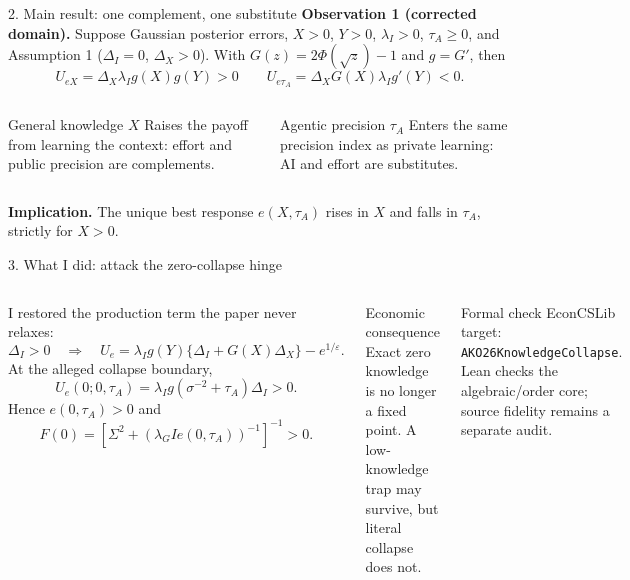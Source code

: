 \documentclass[aspectratio=169,10pt]{beamer}
\begin{document}
\begin{frame}{2. Main result: one complement, one substitute}
\small
\textbf{Observation 1 (corrected domain).} Suppose Gaussian posterior errors, $X>0$, $Y>0$, $\lambda_I>0$, $\tau_A\ge0$, and Assumption 1 ($\Delta_I=0$, $\Delta_X>0$). With $G(z)=2\Phi(\sqrt z)-1$ and $g=G'$, then
\[
\boxed{U_{eX}=\Delta_X\lambda_Ig(X)g(Y)>0}
\qquad
\boxed{U_{e\tau_A}=\Delta_XG(X)\lambda_Ig'(Y)<0}.
\]
\begin{columns}[T,onlytextwidth]
  \begin{block}{General knowledge $X$}
  Raises the payoff from learning the context: effort and public precision are complements.
  \end{block}
  \begin{alertblock}{Agentic precision $\tau_A$}
  Enters the same precision index as private learning: AI and effort are substitutes.
  \end{alertblock}
\end{columns}
\vspace{.15cm}
\textbf{Implication.} The unique best response $e(X,\tau_A)$ rises in $X$ and falls in $\tau_A$, strictly for $X>0$.
\end{frame}

\begin{frame}{3. What I did: attack the zero-collapse hinge}
\small
\begin{columns}[T,onlytextwidth]
  I restored the production term the paper never relaxes:
  \[
  \Delta_I>0\quad\Longrightarrow\quad
  U_e=\lambda_Ig(Y)\{\Delta_I+G(X)\Delta_X\}-e^{1/\varepsilon}.
  \]
  At the alleged collapse boundary,
  \[
  U_e(0;0,\tau_A)=\lambda_Ig(\sigma^{-2}+\tau_A)\Delta_I>0.
  \]
  Hence $e(0,\tau_A)>0$ and
  \[
  F(0)=\left[\Sigma^2+(\lambda_GIe(0,\tau_A))^{-1}\right]^{-1}>0.
  \]
  \begin{alertblock}{Economic consequence}
  Exact zero knowledge is no longer a fixed point. A low-knowledge trap may survive, but literal collapse does not.
  \end{alertblock}
  \begin{block}{Formal check}
  EconCSLib target: \texttt{AKO26KnowledgeCollapse}. Lean checks the algebraic/order core; source fidelity remains a separate audit.
  \end{block}
\end{columns}
\end{frame}
\end{document}
